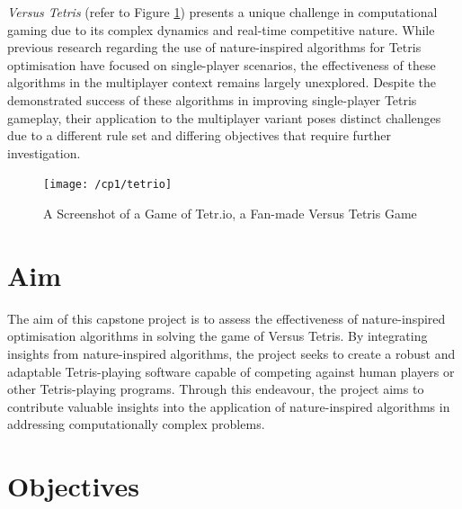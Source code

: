 \documentclass[a4paper, 12pt]{extreport}
\begin{document}
			\textit{Versus Tetris} (refer to Figure \ref{tetrio}) presents a unique challenge in computational gaming due to its complex dynamics and real-time competitive nature. While previous research regarding the use of nature-inspired algorithms for Tetris optimisation have focused on single-player scenarios, the effectiveness of these algorithms in the multiplayer context remains largely unexplored. Despite the demonstrated success of these algorithms in improving single-player Tetris gameplay, their application to the multiplayer variant poses distinct challenges due to a different rule set and differing objectives that require further investigation.
			
			\begin{figure}
				\texttt{[image: /cp1/tetrio]}
				\caption{A Screenshot of a Game of Tetr.io, a Fan-made Versus Tetris Game}
				\label{tetrio}
			\end{figure}
		
		\section{Aim}
		
			
			The aim of this capstone project is to assess the effectiveness of nature-inspired optimisation algorithms in solving the game of Versus Tetris. By integrating insights from nature-inspired algorithms, the project seeks to create a robust and adaptable Tetris-playing software capable of competing against human players or other Tetris-playing programs. Through this endeavour, the project aims to contribute valuable insights into the application of nature-inspired algorithms in addressing computationally complex problems.
		
		\section{Objectives}
		
			
\end{document}
